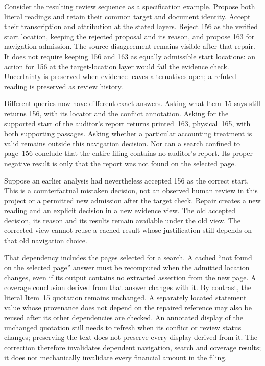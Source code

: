 Consider the resulting review sequence as a specification example. Propose
both literal readings and retain their common target and document identity.
Accept their transcription and attribution at the stated layers. Reject 156
as the verified start location, keeping the rejected proposal and its reason,
and propose 163 for navigation admission. The source disagreement remains
visible after that repair. It does not require keeping 156 and 163 as equally
admissible start locations: an  action for 156 at the
target-location layer would fail the evidence check. Uncertainty is preserved
when evidence leaves alternatives open; a refuted reading is preserved as
review history.

Different queries now have different exact answers. Asking what Item~15 says
still returns 156, with its locator and the conflict annotation. Asking for
the supported start of the auditor's report returns printed~163, physical~165,
with both supporting passages. Asking whether a particular accounting treatment
is valid remains outside this navigation decision. Nor can a search confined
to page~156 conclude that the entire filing contains no auditor's report.
Its proper negative result is only that the report was not found on the
selected page.

Suppose an earlier analysis had nevertheless accepted 156 as the correct
start. This is a counterfactual mistaken decision, not an observed human review
in this project or a permitted new admission after the target check. Repair
creates a new reading and an explicit  decision in a new
evidence view. The old accepted decision, its reason and its results remain
available under the old view. The corrected view cannot reuse a cached result
whose justification still depends on that old navigation choice.

That dependency includes the pages selected for a search. A cached
``not found on the selected page'' answer must be recomputed when the admitted
location changes, even if its output contains no extracted assertion from
the new page. A coverage conclusion derived from that answer changes with it.
By contrast, the literal Item~15 quotation remains unchanged. A separately
located statement value whose provenance does not depend on the repaired
reference may also be reused after its other dependencies are checked.
An annotated display of the unchanged quotation still needs to refresh when
its conflict or review status changes; preserving the text does not preserve
every display derived from it.
The correction therefore invalidates dependent navigation, search and coverage
results; it does not mechanically invalidate every financial amount in the
filing.

